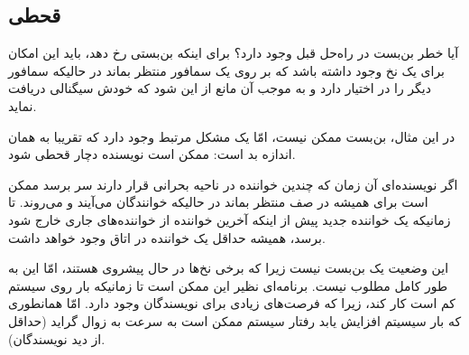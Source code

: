 \documentclass{book}
\begin{document}
\subsection{قحطی}

    آیا خطر بن‌بست در راه‌حل قبل وجود دارد؟ 
    برای اینکه بن‌بستی رخ دهد، باید این امکان برای یک نخ وجود داشته باشد که بر  روی یک سمافور منتظر بماند در حالیکه سمافور دیگر را در اختیار دارد و 
    به موجب آن مانع از این شود که خودش سیگنالی دریافت نماید. 

    در این مثال، بن‌بست ممکن نیست، امّا یک مشکل مرتبط وجود دارد که تقریبا به همان اندازه بد است:‌ ممکن است نویسنده دچار قحطی شود. 

    اگر نویسنده‌ای آن زمان که چندین خواننده در ناحیه بحرانی قرار دارند سر برسد ممکن است برای همیشه در صف منتظر بماند در حالیکه خوانندگان 
    می‌آیند و می‌روند. تا زمانیکه یک خواننده جدید پیش از اینکه آخرین خواننده از خواننده‌های جاری خارج شود برسد، همیشه حداقل یک خواننده در اتاق 
    وجود خواهد داشت. 
    

    این وضعیت یک بن‌بست نیست زیرا که برخی نخ‌ها در حال پیشروی هستند، امّا این به طور کامل مطلوب نیست. 
    برنامه‌ای نظیر این ممکن است تا زمانیکه بار روی سیستم کم است کار کند، زیرا که فرصت‌های زیادی برای نویسندگان وجود دارد. 
    امّا همانطوری که بار سیسیتم افزایش یابد رفتار سیستم ممکن است به سرعت به زوال گراید (حداقل از دید نویسندگان). 
\end{document}
